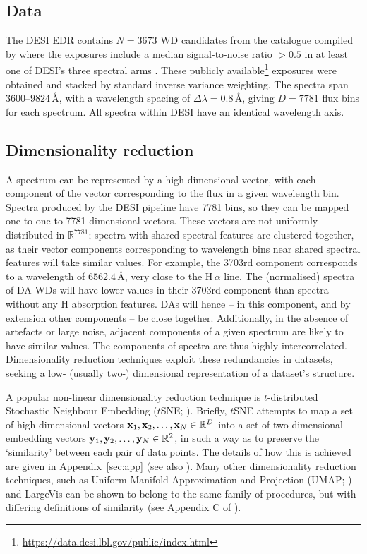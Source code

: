 \documentclass[fleqn,usenatbib]{mnras}
\def\xb{\vb{x}}
\def\yb{\vb{y}}
\begin{document}
\subsection{Data}

The DESI EDR contains $N=3673$ WD candidates from the catalogue compiled by \citet{gentilefusillo19} where the exposures include a median signal-to-noise ratio $>0.5$ in at least one of DESI's three spectral arms \citep{manser24}.
These publicly available\footnote{
    \url{https://data.desi.lbl.gov/public/index.html}
} exposures were obtained and stacked by standard inverse variance weighting.
The spectra span $3600$--$9824\,\text{\AA}$, with a wavelength spacing of $\Delta \lambda = 0.8\,\text{\AA}$, giving $D=7781$ flux bins for each spectrum.
All spectra within DESI have an identical wavelength axis.

\subsection{Dimensionality reduction}

A spectrum can be represented by a high-dimensional vector, with each component of the vector corresponding to the flux in a given wavelength bin.
Spectra produced by the DESI pipeline have 7781 bins, so they can be mapped one-to-one to 7781-dimensional vectors.
These vectors are not uniformly-distributed in $\mathbb{R}^{7781}$;
spectra with shared spectral features are clustered together, as their vector components corresponding to wavelength bins near shared spectral features will take similar values.
For example, the 3703rd component corresponds to a wavelength of $6562.4\,\text{\AA}$, very close to the H$\,\alpha$ line.
The (normalised) spectra of DA WDs will have lower values in their 3703rd component than spectra without any H absorption features.
DAs will hence -- in this component, and by extension other components -- be close together.
Additionally, in the absence of artefacts or large noise, adjacent components of a given spectrum are likely to have similar values.
The components of spectra are thus highly intercorrelated.
Dimensionality reduction techniques exploit these redundancies in datasets, seeking a low- (usually two-) dimensional representation of a dataset's structure.

A popular non-linear dimensionality reduction technique is $t$-distributed Stochastic Neighbour Embedding ($t$SNE; \citealt{tsne}).
Briefly, $t$SNE attempts to map a set of high-dimensional vectors $\xb_1, \xb_2, \dots, \xb_N \in \mathbb{R}^D$ into a set of two-dimensional embedding vectors $\yb_1, \yb_2, \dots, \yb_N \in \mathbb{R}^2$, in such a way as to preserve the `similarity' between each pair of data points.
The details of how this is achieved are given in Appendix~\ref{sec:app} (see also \citealt{tsne}).
Many other dimensionality reduction techniques, such as Uniform Manifold Approximation and Projection (UMAP; \citealt{umap}) and LargeVis \citep{largevis} can be shown to belong to the same family of procedures, but with differing definitions of similarity (see Appendix C of \citealt{umap}).
\end{document}
